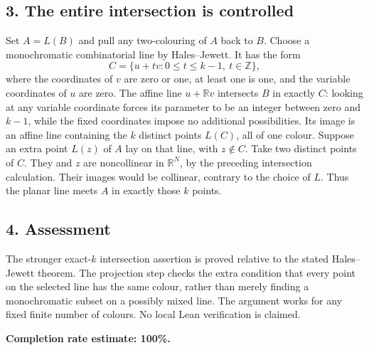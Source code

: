 \subsection*{3. The entire intersection is controlled}
Set $A=L(B)$ and pull any two-colouring of $A$ back to $B$. Choose a monochromatic combinatorial line by Hales--Jewett. It has the form
\[
 C=\{u+t v:0\le t\le k-1,\ t\in\mathbb Z\},
\]
where the coordinates of $v$ are zero or one, at least one is one, and the variable coordinates of $u$ are zero. The affine line $u+\mathbb Rv$ intersects $B$ in exactly $C$: looking at any variable coordinate forces its parameter to be an integer between zero and $k-1$, while the fixed coordinates impose no additional possibilities.
Its image is an affine line containing the $k$ distinct points $L(C)$, all of one colour. Suppose an extra point $L(z)$ of $A$ lay on that line, with $z\notin C$. Take two distinct points of $C$. They and $z$ are noncollinear in $\mathbb R^N$, by the preceding intersection calculation. Their images would be collinear, contrary to the choice of $L$. Thus the planar line meets $A$ in exactly those $k$ points.

\subsection*{4. Assessment}
The stronger exact-$k$ intersection assertion is proved relative to the stated Hales--Jewett theorem. The projection step checks the extra condition that every point on the selected line has the same colour, rather than merely finding a monochromatic subset on a possibly mixed line. The argument works for any fixed finite number of colours. No local Lean verification is claimed.

\textbf{Completion rate estimate: 100\%.}
